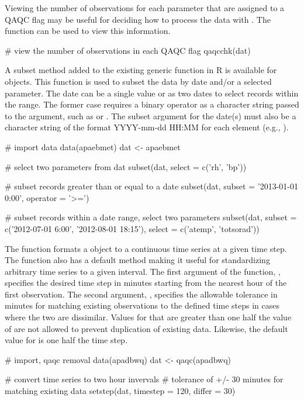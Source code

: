 Viewing the number of observations for each parameter that are assigned to a QAQC flag may be useful for deciding how to process the data with .  The  function can be used to view this information.

\begin{example}
# view the number of observations in each QAQC flag
qaqcchk(dat)
\end{example}

A subset method added to the existing generic  function in R is available for  objects.  This function is used to subset the data by date and/or a selected parameter.  The date can be a single value or as two dates to select records within the range. The former case requires a binary operator as a character string passed to the  argument, such as  or .  The subset argument for the date(s) must also be a character string of the format YYYY-mm-dd HH:MM for each element (e.g., ). 

\begin{example}
# import data
data(apaebmet)
dat <- apaebmet

# select two parameters from dat
subset(dat, select = c('rh', 'bp'))

# subset records greater than or equal to a date
subset(dat, subset = '2013-01-01 0:00', operator = '>=')

# subset records within a date range, select two parameters
subset(dat, subset = c('2012-07-01 6:00', '2012-08-01 18:15'),
  select = c('atemp', 'totsorad'))
\end{example}

The  function formats a  object to a continuous time series at a given time step.  The function also has a default method making it useful for standardizing arbitrary time series to a given interval.  The first argument of the function, , specifies the desired time step in minutes starting from the nearest hour of the first observation.  The second argument, , specifies the allowable tolerance in minutes for matching existing observations to the defined time steps in cases where the two are dissimilar.  Values for  that are greater than one half the value of  are not allowed to prevent duplication of existing data.  Likewise, the default value for  is one half the time step.

\begin{example}
# import, qaqc removal
data(apadbwq)
dat <- qaqc(apadbwq)

# convert time series to two hour invervals
# tolerance of +/- 30 minutes for matching existing data
setstep(dat, timestep = 120, differ = 30)
\end{example}

